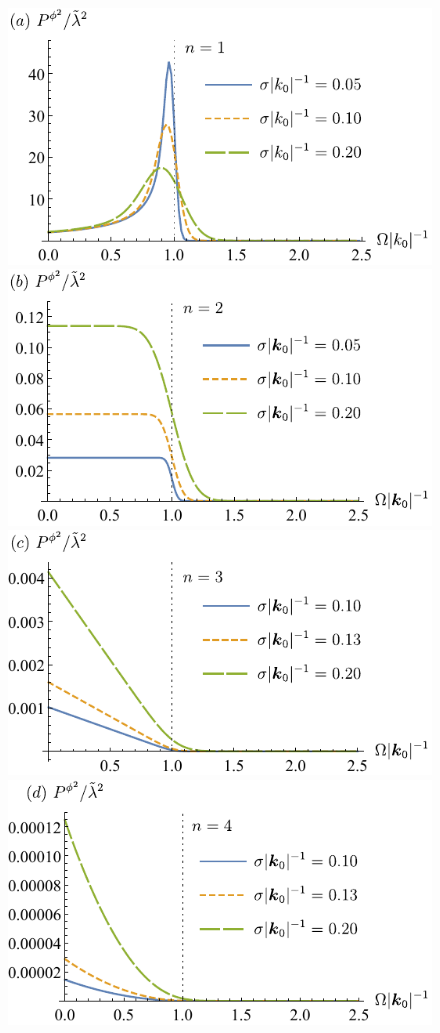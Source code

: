 \documentclass[prd,twocolumn,superscriptaddress,nofootinbib,floatfix,amsmath,amssymb]{revtex4-2}
\begin{document}
    
    	
    \begin{figure}[htp]
        \includegraphics[scale=0.8]{Fig3a.pdf}
        \includegraphics[scale=0.8]{Fig3b.pdf}
        \includegraphics[scale=0.8]{Fig3c.pdf}
        \includegraphics[scale=0.8]{Fig3d.pdf}

\end{figure}
\end{document}
